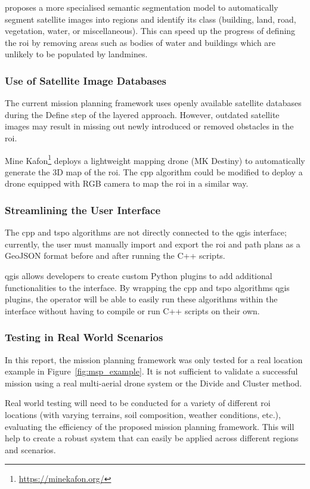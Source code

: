 \cite{patil2022segment} proposes a more specialised semantic segmentation model to automatically segment satellite images into regions and identify its class (building, land, road, vegetation, water, or miscellaneous). This can speed up the progress of defining the \gls{roi} by removing areas such as bodies of water and buildings which are unlikely to be populated by landmines. 

\subsubsection{Use of Satellite Image Databases}
\label{sec:msp_satellite_database_limitation}

The current mission planning framework uses openly available satellite databases during the Define step of the layered approach. However, outdated satellite images may result in missing out newly introduced or removed obstacles in the \gls{roi}. 

Mine Kafon\footnote{\url{https://minekafon.org/}} deploys a lightweight mapping drone (MK Destiny) to automatically generate the 3D map of the \gls{roi}. The \gls{cpp} algorithm could be modified to deploy a drone equipped with RGB camera to map the \gls{roi} in a similar way.  

\subsubsection{Streamlining the User Interface}

The \gls{cpp} and \gls{tspo} algorithms are not directly connected to the \gls{qgis} interface; currently, the user must manually import and export the \gls{roi} and path plans as a GeoJSON format before and after running the C++ scripts. 

\gls{qgis} allows developers to create custom Python plugins to add additional functionalities to the interface. By wrapping the \gls{cpp} and \gls{tspo} algorithms \gls{qgis} plugins, the operator will be able to easily run these algorithms within the interface without having to compile or run C++ scripts on their own. 

\subsubsection{Testing in Real World Scenarios}

In this report, the mission planning framework was only tested for a real location example in Figure~\ref{fig:msp_example}. It is not sufficient to validate a successful mission using a real multi-aerial drone system or the Divide and Cluster method. 

Real world testing will need to be conducted for a variety of different \gls{roi} locations (with varying terrains, soil composition, weather conditions, etc.), evaluating the efficiency of the proposed mission planning framework. This will help to create a robust system that can easily be applied across different regions and scenarios. 